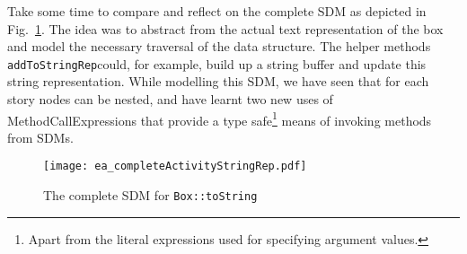 \begin{itemize}

Take some time to compare and reflect on the complete SDM as depicted in Fig.~\ref{fig:sdm_tostring_5}.  The idea was to abstract from the actual text
representation of the box and model the necessary traversal of the data structure. The helper methods \texttt{addToStringRep}could, for example, build up a
string buffer and update this string representation. While modelling this SDM, we have seen that for each story nodes can be nested, and have learnt two new
uses of MethodCallExpressions that provide a type safe\footnote{Apart from the literal expressions used for specifying argument values.} means of invoking
methods from SDMs.

\begin{figure}[htbp]
\begin{center}
  \texttt{[image: ea\_completeActivityStringRep.pdf]}
  \caption{The complete SDM for \texttt{Box::toString}}  
  \label{fig:sdm_tostring_5}
\end{center}
\end{figure}
\FloatBarrier

\end{itemize}
